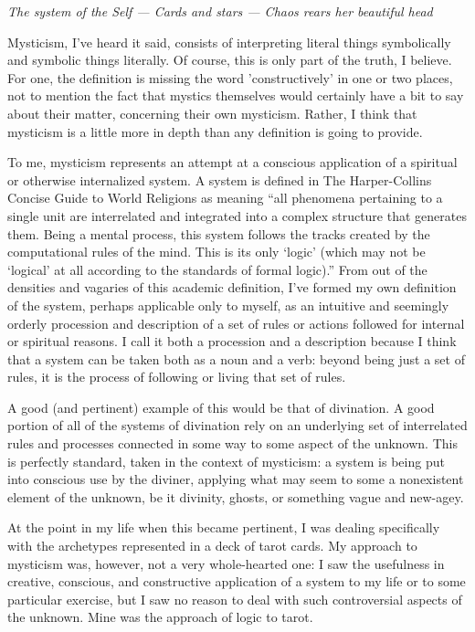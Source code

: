 \emph{The system of the Self --- Cards and stars --- Chaos rears her beautiful head}

Mysticism, I've heard it said, consists of interpreting literal things symbolically and symbolic things literally. Of course, this is only part of the truth, I believe. For one, the definition is missing the word 'constructively' in one or two places, not to mention the fact that mystics themselves would certainly have a bit to say about their matter, concerning their own mysticism. Rather, I think that mysticism is a little more in depth than any definition is going to provide.

To me, mysticism represents an attempt at a conscious application of a spiritual or otherwise internalized system. A system is defined in The Harper-Collins Concise Guide to World Religions as meaning ``all phenomena pertaining to a single unit are interrelated and integrated into a complex structure that generates them. Being a mental process, this system follows the tracks created by the computational rules of the mind. This is its only `logic' (which may not be `logical' at all according to the standards of formal logic).'' From out of the densities and vagaries of this academic definition, I've formed my own definition of the system, perhaps applicable only to myself, as an intuitive and seemingly orderly procession and description of a set of rules or actions followed for internal or spiritual reasons. I call it both a procession and a description because I think that a system can be taken both as a noun and a verb: beyond being just a set of rules, it is the process of following or living that set of rules.

A good (and pertinent) example of this would be that of divination. A good portion of all of the systems of divination rely on an underlying set of interrelated rules and processes connected in some way to some aspect of the unknown. This is perfectly standard, taken in the context of mysticism: a system is being put into conscious use by the diviner, applying what may seem to some a nonexistent element of the unknown, be it divinity, ghosts, or something vague and new-agey.

At the point in my life when this became pertinent, I was dealing specifically with the archetypes represented in a deck of tarot cards. My approach to mysticism was, however, not a very whole-hearted one: I saw the usefulness in creative, conscious, and constructive application of a system to my life or to some particular exercise, but I saw no reason to deal with such controversial aspects of the unknown. Mine was the approach of logic to tarot.

